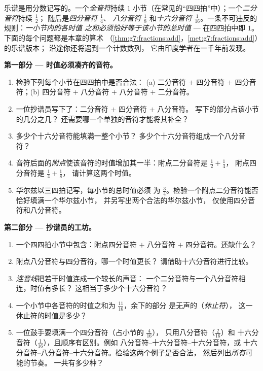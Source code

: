 \begin{problem}
\label{pb:g7:fractions:1}
乐谱是用分数记写的。一个\emph{全音符}持续 $1$
小节（在常见的“四四拍”中）；一个\emph{二分音符}持续 $\frac12$；
随后是\emph{四分音符} $\frac14$、
\emph{八分音符} $\frac18$ 和\emph{十六分音符}
$\frac{1}{16}$。一条不可违反的规则：\emph{一小节内的各时值
之和必须恰好等于该小节的总时值} --- 在四四拍中即 $1$。
下面的每个问题都是本章的算术
（\cref{thm:g7:fractions:add}，\cref{met:g7:fractions:add}）的乐谱版本；
沿途你还将遇到一个计数数列，
它由印度学者在一千年前发现。

\medskip
\noindent\textbf{第一部分 --- 时值必须凑齐的音符。}
\begin{enumerate}
  \item 检验下列每个小节在四四拍中是否合法：
        (a) 二分音符 $+$ 四分音符 $+$ 四分音符；(b) 四分音符 $+$
        八分音符 $+$ 八分音符 $+$ 二分音符。
  \item 一位抄谱员写下了：二分音符 $+$ 四分音符 $+$ 八分音符。
        写下的部分占该小节的几分之几？
        还需要哪一个单独的音符才能将其补全？
  \item 多少个十六分音符能填满一整个小节？
        多少个十六分音符组成一个八分音符？
  \item 音符后面的\emph{附点}使该音符的时值增加其一半：附点二分音符是 $\frac12 + \frac14$，
        附点四分音符是 $\frac14 + \frac18$，
        请计算这两个时值。
  \item 华尔兹以三四拍记写，每小节的总时值必须
        为 $\frac34$。检验一个附点二分音符能否恰好填满一个华尔兹小节，
        并另写出两个合法的华尔兹小节，
        仅使用四分音符和八分音符。
\end{enumerate}

\medskip
\noindent\textbf{第二部分 --- 抄谱员的工坊。}
\begin{enumerate}[resume]
  \item 一个四四拍小节中包含：附点四分音符 $+$ 八分音符
        $+$ 四分音符。还缺什么？
  \item 附点八分音符与四分音符，哪一个时值更长？
        请借助十六分音符进行比较。
  \item \emph{连音线}把若干时值连成一个较长的声音：
        一个二分音符与一个八分音符相连，时值有多长？
        这相当于多少个十六分音符？
  \item 一个小节中各音符的时值之和为 $\frac{11}{16}$，余下的部分
        是无声的（\emph{休止符}），
        这一休止符的时值是多少？
  \item 一位鼓手要填满一个四分音符（占小节的 $\frac{4}{16}$），
        只用八分音符（$\frac{2}{16}$）和
        十六分音符（$\frac{1}{16}$），且顺序有区别。例如
        八分音符--十六分音符--十六分音符，或
        十六分音符--八分音符--十六分音符。检验这两个例子是否合法，
        然后列出\emph{所有}可能的节奏。
        一共有多少种？
\end{enumerate}


\end{problem}
